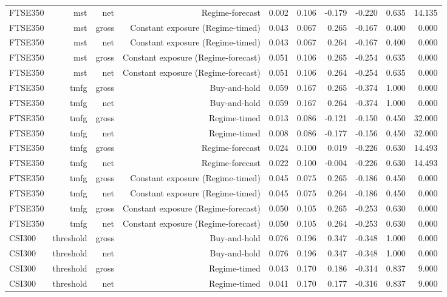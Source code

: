 \begin{tabular}{lrrrrrrrrr}
FTSE350 & mst & net & Regime-forecast & 0.002 & 0.106 & -0.179 & -0.220 & 0.635 & 14.135 \\
FTSE350 & mst & gross & Constant exposure (Regime-timed) & 0.043 & 0.067 & 0.265 & -0.167 & 0.400 & 0.000 \\
FTSE350 & mst & net & Constant exposure (Regime-timed) & 0.043 & 0.067 & 0.264 & -0.167 & 0.400 & 0.000 \\
FTSE350 & mst & gross & Constant exposure (Regime-forecast) & 0.051 & 0.106 & 0.265 & -0.254 & 0.635 & 0.000 \\
FTSE350 & mst & net & Constant exposure (Regime-forecast) & 0.051 & 0.106 & 0.264 & -0.254 & 0.635 & 0.000 \\
FTSE350 & tmfg & gross & Buy-and-hold & 0.059 & 0.167 & 0.265 & -0.374 & 1.000 & 0.000 \\
FTSE350 & tmfg & net & Buy-and-hold & 0.059 & 0.167 & 0.264 & -0.374 & 1.000 & 0.000 \\
FTSE350 & tmfg & gross & Regime-timed & 0.013 & 0.086 & -0.121 & -0.150 & 0.450 & 32.000 \\
FTSE350 & tmfg & net & Regime-timed & 0.008 & 0.086 & -0.177 & -0.156 & 0.450 & 32.000 \\
FTSE350 & tmfg & gross & Regime-forecast & 0.024 & 0.100 & 0.019 & -0.226 & 0.630 & 14.493 \\
FTSE350 & tmfg & net & Regime-forecast & 0.022 & 0.100 & -0.004 & -0.226 & 0.630 & 14.493 \\
FTSE350 & tmfg & gross & Constant exposure (Regime-timed) & 0.045 & 0.075 & 0.265 & -0.186 & 0.450 & 0.000 \\
FTSE350 & tmfg & net & Constant exposure (Regime-timed) & 0.045 & 0.075 & 0.264 & -0.186 & 0.450 & 0.000 \\
FTSE350 & tmfg & gross & Constant exposure (Regime-forecast) & 0.050 & 0.105 & 0.265 & -0.253 & 0.630 & 0.000 \\
FTSE350 & tmfg & net & Constant exposure (Regime-forecast) & 0.050 & 0.105 & 0.264 & -0.253 & 0.630 & 0.000 \\
CSI300 & threshold & gross & Buy-and-hold & 0.076 & 0.196 & 0.347 & -0.348 & 1.000 & 0.000 \\
CSI300 & threshold & net & Buy-and-hold & 0.076 & 0.196 & 0.347 & -0.348 & 1.000 & 0.000 \\
CSI300 & threshold & gross & Regime-timed & 0.043 & 0.170 & 0.186 & -0.314 & 0.837 & 9.000 \\
CSI300 & threshold & net & Regime-timed & 0.041 & 0.170 & 0.177 & -0.316 & 0.837 & 9.000 \\

\end{tabular}
